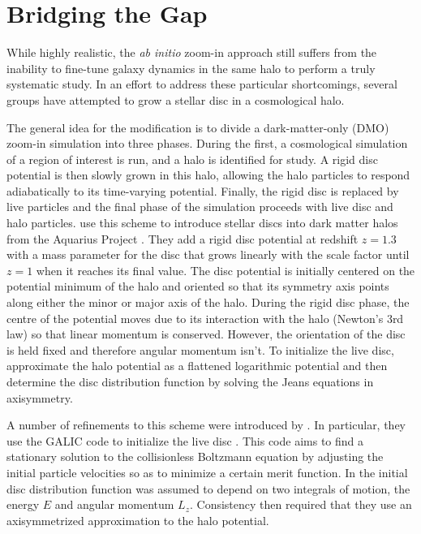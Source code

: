 \section{Bridging the Gap}

While highly realistic, the \textit{ab initio} zoom-in approach still suffers from the inability to fine-tune galaxy dynamics in the same halo to perform a truly systematic study. In an effort to address these particular shortcomings, several groups have attempted to grow a stellar disc in a cosmological halo.  


The general idea for the modification is to divide a dark-matter-only (DMO) zoom-in simulation into three phases.  During the first, a cosmological simulation of a region of interest is run, and a halo is identified for study.  A rigid disc potential is then slowly grown in this halo, allowing the halo particles to respond adiabatically to its time-varying potential.  Finally, the rigid disc is replaced by live particles and the final phase of the simulation proceeds with live disc and halo particles.  \citet{debuhr_2012} use this scheme to introduce stellar discs into dark matter halos from the Aquarius Project \citep{springel2008}.  They add a rigid disc potential at redshift $z=1.3$ with a mass parameter for the disc that grows linearly with the scale factor until $z=1$ when it reaches its final value.  The disc potential is initially centered on the potential minimum of the halo and oriented so that its symmetry axis points along either the minor or major axis of the halo.  During the rigid disc phase, the centre of the potential moves due to its interaction with the halo (Newton's 3rd law) so that linear momentum is conserved.  However, the orientation of the disc is held fixed and therefore angular momentum isn't.  To initialize the live disc, \citet{debuhr_2012} approximate the halo potential as a flattened logarithmic potential and then determine the disc distribution function by solving the Jeans equations in axisymmetry. 

A number of refinements to this scheme were introduced by \citet{ys_2015}.  In particular, they use the GALIC code to initialize the live disc \citet{YurinSpringelGalic}.  This code aims to find a stationary solution to the collisionless Boltzmann equation by adjusting the initial particle velocities so as to minimize a certain merit function.  In \citet{ys_2015} the initial disc distribution function was assumed to depend on two integrals of motion, the energy $E$ and angular momentum $L_z$.  Consistency then required that they use an axisymmetrized approximation to the halo potential.

